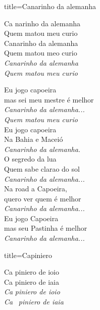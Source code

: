 \documentclass[fontsize=14pt, paper=a4, twoside, DIV=20]{scrreprt} %
\begin{document}
\begin{multicols*}{2}
\begin{song}{title={Canarinho da alemanha}}
    \begin{chorus*}
            Ca narinho da alemanha\\
            Quem matou meu curio\\
            Canarinho da alemanha\\
            Quem matou meo curio\\
            \textit{Canarinho da alemanha}\\
            \textit{Quem matou meu curio}
    \end{chorus*}
        \begin{verse*}
            Eu jogo capoeira\\
            mas sei meu mestre é melhor\\
            \textit{Canarinho da alemanha...}\\
            \textit{Quem matou meu curio}\\
            Eu jogo capoeira\\
            Na Bahia e Maceió\\
            \textit{Canarinho da alemanha.}\\
            O segredo da lua\\
            Quem sabe clarao do sol\\
            \textit{Canarinho da alemanha...}\\
            Na road a Capoeira,\\
            quero ver quem é melhor\\
            \textit{Canarinho da alemanha...}\\
            Eu jogo Capoeira\\
            mas seu Pastinha é melhor\\
            \textit{Canarinho da alemanha...}\\
        \end{verse*}
\end{song}
\begin{song}{title={Capiniero}}
        \begin{verse*}
            Ca piniero de ioio\\
            Ca piniero de iaia\\
            \textit{Ca} \textit{piniero de ioio}\\
            \textit{Ca} \ \textit{piniero de iaia}\\

\end{verse*}
\end{song}
\end{multicols*}
\end{document}

